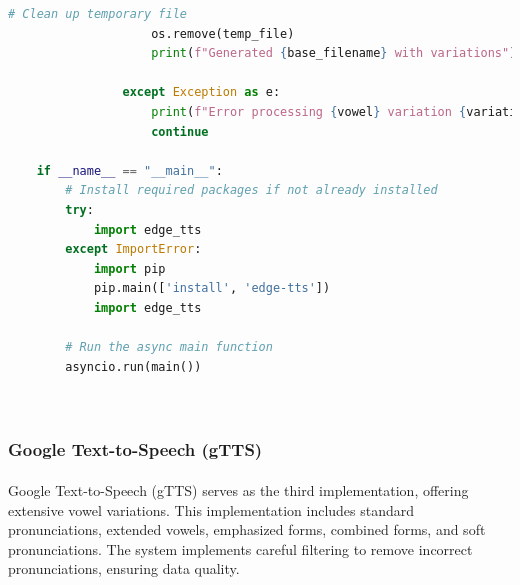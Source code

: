 \begin{lstlisting}[language=Python, caption={Audio Generation with Edge TTS}]
                    # Clean up temporary file
                    os.remove(temp_file)
                    print(f"Generated {base_filename} with variations")
                    
                except Exception as e:
                    print(f"Error processing {vowel} variation {variation}: {str(e)}")
                    continue
    
    if __name__ == "__main__":
        # Install required packages if not already installed
        try:
            import edge_tts
        except ImportError:
            import pip
            pip.main(['install', 'edge-tts'])
            import edge_tts
    
        # Run the async main function
        asyncio.run(main())
    



\end{lstlisting}

\subsubsection{Google Text-to-Speech (gTTS)}
\paragraph{}
Google Text-to-Speech (gTTS) serves as the third implementation, offering extensive vowel variations. This implementation includes standard pronunciations, extended vowels, emphasized forms, combined forms, and soft pronunciations. The system implements careful filtering to remove incorrect pronunciations, ensuring data quality.

